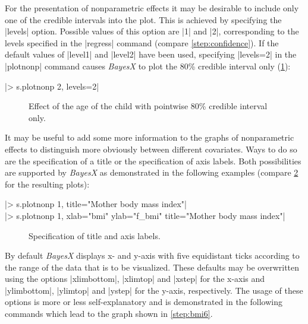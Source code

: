 For the presentation of nonparametric effects it may be desirable to include only one of the credible intervals into the plot.
This is achieved by specifying the |levels| option. Possible values of this option are |1| and |2|, corresponding to the levels
specified in the |regress| command (compare \ref{step:confidence}). If the default values of |level1| and |level2| have been
used, specifying |levels=2| in the |plotnonp| command causes {\it BayesX} to plot the 80\% credible interval only
(\ref{step:agc3}):

|> s.plotnonp 2, levels=2|

\begin{figure}[ht]
\begin{center}
{\it\caption{Effect of the age of the child with pointwise 80\%
credible interval only.\label{step:agc3}}}
\end{center}
\end{figure}

It may be useful to add some more information to the graphs of nonparametric effects to distinguish more obviously between
different covariates. Ways to do so are the specification of a title or the specification of axis labels. Both possibilities
are supported by {\it BayesX} as demonstrated in the following examples (compare \ref{step:bmi4} for the resulting plots):

 |> s.plotnonp 1, title="Mother body mass index"|\\
 |> s.plotnonp 1, xlab="bmi" ylab="f_bmi" title="Mother body mass index"|

\begin{figure}[ht]
\begin{center}
\begin{multicols}{2}
\end{multicols}
{\it\caption{Specification of title and axis
labels.\label{step:bmi4}}}
\end{center}
\end{figure}

By default {\it BayesX} displays x- and y-axis with five equidistant ticks according to the range of the data that is to be
visualized. These defaults may be overwritten using the options |xlimbottom|, |xlimtop| and |xstep| for the x-axis and
|ylimbottom|, |ylimtop| and |ystep| for the y-axis, respectively. The usage of these options is more or less self-explanatory
and is demonstrated in the following commands which lead to the graph shown in \ref{step:bmi6}.

